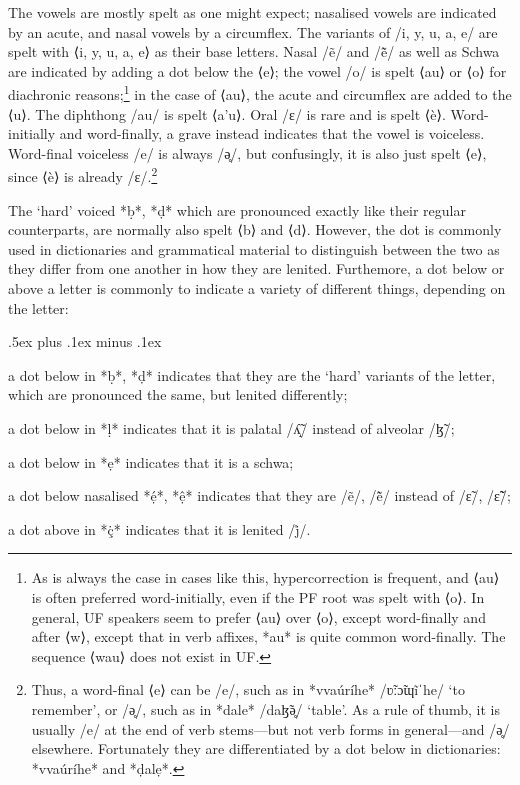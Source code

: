 \documentclass[a4paper, 12pt, oneside, final]{article}
\begin{document}
The vowels are mostly spelt as one might expect; nasalised vowels are indicated by an acute, and nasal vowels by a circumflex.
The variants of /i, y, u, a, e/ are spelt with ⟨i, y, u, a, e⟩ as their base letters. Nasal /ẽ/ and /ẽ̃/ as well as Schwa are
indicated by adding a dot below the ⟨e⟩; the vowel /o/ is spelt ⟨au⟩ or ⟨o⟩ for diachronic reasons;\footnote{As is always the
case in cases like this, hypercorrection is frequent, and ⟨au⟩ is often preferred word-initially, even if the
PF root was spelt with ⟨o⟩. In general, UF speakers seem to prefer ⟨au⟩ over ⟨o⟩, except word-finally and after ⟨w⟩, except
that in verb affixes, *au* is quite common word-finally. The sequence ⟨wau⟩ does not exist in UF.} in the case of
⟨au⟩, the acute and circumflex are added to the ⟨u⟩. The diphthong /au/ is spelt ⟨a’u⟩. Oral
/ɛ/ is rare and is spelt ⟨è⟩. Word-initially and word-finally, a grave instead indicates that the vowel is voiceless. Word-final
voiceless /e/ is always /ə̥/, but confusingly, it is also just spelt ⟨e⟩, since ⟨è⟩ is already /ɛ/.\footnote{Thus, a word-final ⟨e⟩
can be /e/, such as in *vvaúríhe* /ʋ̃ːɔ̃ɰĩˈhe/ ‘to remember’, or /ə̥/, such as in *dale* /daɮ̃ə̥/ ‘table’. As a rule of thumb, it is
usually /e/ at the end of verb stems—but not verb forms in general—and /ə̥/ elsewhere. Fortunately they are differentiated by a
dot below in dictionaries: *vvaúríhe* and *ḍalẹ*.}

The ‘hard’ voiced *ḅ*, *ḍ* which are pronounced exactly like their regular counterparts, are normally also spelt ⟨b⟩ and
⟨d⟩. However, the dot is commonly used in dictionaries and grammatical material to distinguish between the two
as they differ from one another in how they are lenited. Furthemore, a dot below or above a letter is commonly to indicate
a variety of different things, depending on the letter:
\begin{items}\itemsep .5ex plus .1ex minus .1ex\relax
\item a dot below in *ḅ*, *ḍ* indicates that they are the ‘hard’ variants of the letter, which are pronounced
      the same, but lenited differently;
\item a dot below in *ḷ* indicates that it is palatal /ʎ̝̃/ instead of alveolar /ɮ̃/;
\item a dot below in *ẹ* indicates that it is a schwa;
\item a dot below nasalised *ẹ́*, *ệ* indicates that they are /ẽ/, /ẽ̃/ instead of /ɛ̃/, /ɛ̃̃/;
\item a dot above in *ç̇* indicates that it is lenited /j̊/.
\end{items}
\end{document}
